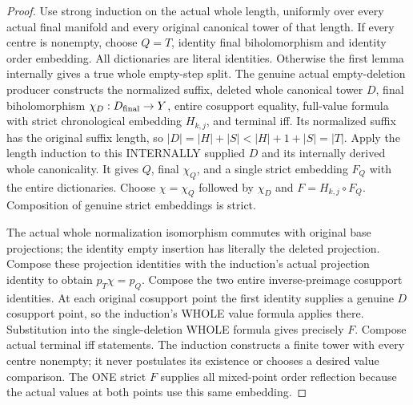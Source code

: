 \begin{proof}
Use strong induction on the actual whole length, uniformly over every
actual final manifold and every original canonical tower of that length.
If every centre is nonempty, choose $Q=T$, identity final biholomorphism
and identity order embedding. All dictionaries are literal identities.
Otherwise the first lemma internally gives a true whole empty-step split.
The genuine actual empty-deletion producer constructs the normalized
suffix, deleted whole canonical tower $D$, final biholomorphism
$\chi_D:D_{\rm final}\to Y$, entire cosupport equality, full-value formula
with strict chronological embedding $H_{k,j}$, and terminal iff. Its
normalized suffix has the original suffix length, so
$|D|=|H|+|S|<|H|+1+|S|=|T|$. Apply the length induction to this INTERNALLY
supplied $D$ and its internally derived whole canonicality. It gives
$Q$, final $\chi_Q$, and a single strict embedding $F_Q$ with the entire
dictionaries. Choose $\chi=\chi_Q$ followed by $\chi_D$ and
$F=H_{k,j}\circ F_Q$. Composition of genuine strict embeddings is strict.

The actual whole normalization isomorphism commutes with original base
projections; the identity empty insertion has literally the deleted
projection. Compose these projection identities with the induction's
actual projection identity to obtain $p_T\chi=p_Q$. Compose the two
entire inverse-preimage cosupport identities. At each original cosupport
point the first identity supplies a genuine $D$ cosupport point, so the
induction's WHOLE value formula applies there. Substitution into the
single-deletion WHOLE formula gives precisely $F$. Compose actual terminal
iff statements. The induction constructs a finite tower with every centre
nonempty; it never postulates its existence or chooses a desired value
comparison. The ONE strict $F$ supplies all mixed-point order reflection
because the actual values at both points use this same embedding.
\end{proof}

